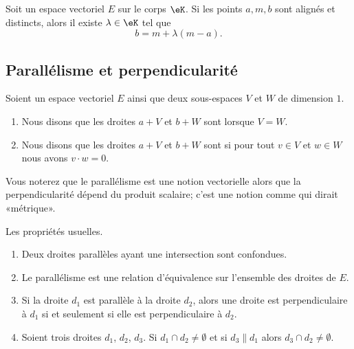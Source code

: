 \begin{proposition}	\label{PROPooEBXLooKewanh}
	Soit un espace vectoriel \( E\) sur le corps \( \eK\). Si les points \( a,m,b\) sont alignés et distincts, alors il existe \( \lambda\in \eK\) tel que
	\begin{equation}
		b=m+\lambda(m-a).
	\end{equation}
\end{proposition}


\subsection{Parallélisme et perpendicularité}


\begin{definition}		\label{DEFooXVWGooIDYXGj}
	Soient un espace vectoriel \( E\) ainsi que deux sous-espaces \( V\) et \( W\) de dimension \( 1\).
	\begin{enumerate}
		\item		\label{ITEMooWTVKooPohmUX}
		      Nous disons que les droites \( a+V\) et \( b+W\) sont  lorsque \( V=W\).
		\item
		      Nous disons que les droites \( a+V\) et \( b+W\) sont  si pour tout \( v\in V\) et \( w\in W\) nous avons \( v\cdot w=0\).
	\end{enumerate}
\end{definition}


Vous noterez que le parallélisme est une notion vectorielle alors que la perpendicularité dépend du produit scalaire; c'est une notion comme qui dirait «métrique».

\begin{proposition}     \label{PROPooADJNooMyXUxG}
	Les propriétés usuelles.
	\begin{enumerate}
		\item		\label{ITEMooSXVYooBUvvxj}
		      Deux droites parallèles ayant une intersection sont confondues.
		\item		\label{ITEMooXUBUooJoEKRi}
		      Le parallélisme est une relation d'équivalence sur l'ensemble des droites de \( E\).
		\item
		      Si la droite \( d_1\) est parallèle à la droite \( d_2\), alors une droite est perpendiculaire à \( d_1\) si et seulement si elle est perpendiculaire à \( d_2\).
		\item		\label{ITEMooOSSTooCzrUeT}
		      Soient trois droites \( d_1\), \( d_2\), \( d_3\). Si \( d_1\cap d_2\neq\emptyset\) et si \( d_3\parallel d_1\) alors \( d_3\cap d_2\neq\emptyset\).
	\end{enumerate}
\end{proposition}

